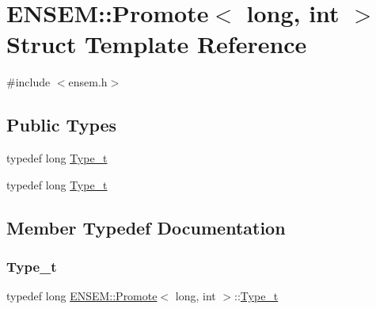 \hypertarget{structENSEM_1_1Promote_3_01long_00_01int_01_4}{}\section{E\+N\+S\+EM\+:\+:Promote$<$ long, int $>$ Struct Template Reference}
\label{structENSEM_1_1Promote_3_01long_00_01int_01_4}


{\ttfamily \#include $<$ensem.\+h$>$}

\subsection*{Public Types}
\begin{DoxyCompactItemize}
\item 
typedef long \mbox{\hyperlink{structENSEM_1_1Promote_3_01long_00_01int_01_4_a98c4c916d9b142fd471add21a6769683}{Type\+\_\+t}}
\item 
typedef long \mbox{\hyperlink{structENSEM_1_1Promote_3_01long_00_01int_01_4_a98c4c916d9b142fd471add21a6769683}{Type\+\_\+t}}
\end{DoxyCompactItemize}


\subsection{Member Typedef Documentation}
\mbox{\label{structENSEM_1_1Promote_3_01long_00_01int_01_4_a98c4c916d9b142fd471add21a6769683}} 
\subsubsection{\texorpdfstring{Type\_t}{Type\_t}\hspace{0.1cm}{\footnotesize\ttfamily [1/2]}}
{\footnotesize\ttfamily typedef long \mbox{\hyperlink{structENSEM_1_1Promote}{E\+N\+S\+E\+M\+::\+Promote}}$<$ long, int $>$\+::\mbox{\hyperlink{structENSEM_1_1Promote_3_01long_00_01int_01_4_a98c4c916d9b142fd471add21a6769683}{Type\+\_\+t}}}

\mbox{\label{structENSEM_1_1Promote_3_01long_00_01int_01_4_a98c4c916d9b142fd471add21a6769683}} 
